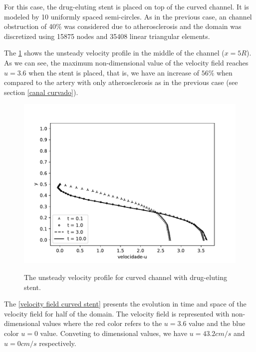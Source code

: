 For this case, the drug-eluting stent is placed on top of 
the curved channel. It is modeled by 10 uniformly spaced 
semi-circles. As in the previous case, an channel obstruction of 
40\% was considered due to atherosclerosis and the domain was 
discretized using 15875 nodes and 35408 linear triangular elements. 

\par 
The \ref{velocity evolution curved stent} shows the unsteady velocity 
profile in the middle of the channel ($x=5R$). 
As we can see, the maximum non-dimensional value of the velocity field 
reaches $u=3.6$ when the stent is placed, that is, we have an 
increase of $56$\% when compared to the artery with only 
atherosclerosis as in the previous case 
(see section \ref{canal curvado}).

\begin{figure}[H]
     \centering
     \includegraphics[scale=1]{./02_chaps/cap_solution/figure/vel_CurvedStrut_evol.pdf}\\
     \caption{
The unsteady velocity profile for curved channel with drug-eluting stent.}
     \label{velocity evolution curved stent}
\end{figure}

\newpage
The \ref{velocity field curved stent} presents the evolution in 
time and space of the velocity field for half of the domain. 
The velocity field is represented with non-dimensional values 
where the red color refers to the $u=3.6$ value and the blue color 
$u=0$ value. Conveting to dimensional values, 
we have $u=43.2cm/s$ and $u=0cm/s$ respectively.

